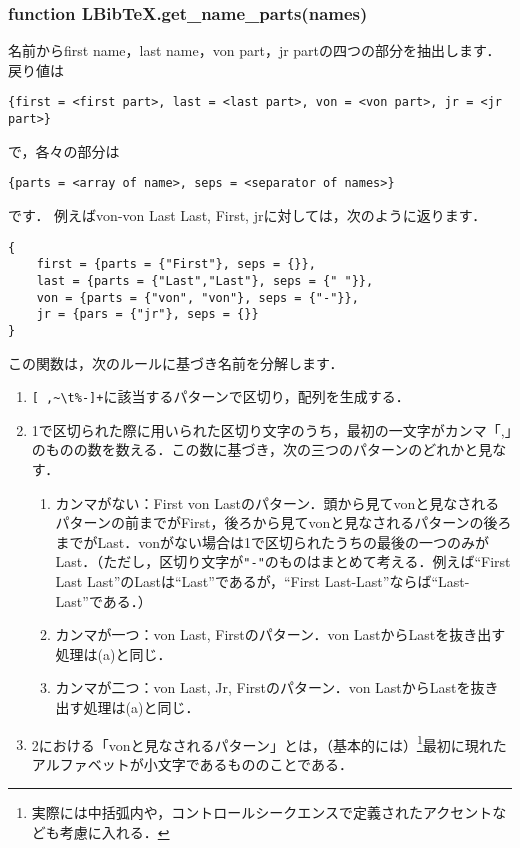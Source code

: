 \documentclass[a4paper]{ltjsarticle}
\begin{document}
\subsubsection{function LBibTeX.get\_name\_parts(names)}
名前からfirst name，last name，von part，jr partの四つの部分を抽出します．
戻り値は
\begin{lstlisting}
{first = <first part>, last = <last part>, von = <von part>, jr = <jr part>}
\end{lstlisting}
で，各々の部分は
\begin{lstlisting}
{parts = <array of name>, seps = <separator of names>}
\end{lstlisting}
です．%
例えばvon-von Last Last, First, jrに対しては，次のように返ります．
\begin{lstlisting}
{
	first = {parts = {"First"}, seps = {}},
	last = {parts = {"Last","Last"}, seps = {" "}},
	von = {parts = {"von", "von"}, seps = {"-"}},
	jr = {pars = {"jr"}, seps = {}}
}
\end{lstlisting}

この関数は，次のルールに基づき名前を分解します．
\begin{enumerate}
\item \verb|[ ,~\t%-]+|に該当するパターンで区切り，配列を生成する．
\item 1で区切られた際に用いられた区切り文字のうち，最初の一文字がカンマ「,」のものの数を数える．この数に基づき，次の三つのパターンのどれかと見なす．
\begin{enumerate}
\item カンマがない：First von Lastのパターン．頭から見てvonと見なされるパターンの前までがFirst，後ろから見てvonと見なされるパターンの後ろまでがLast．vonがない場合は1で区切られたうちの最後の一つのみがLast．（ただし，区切り文字が\verb|"-"|のものはまとめて考える．例えば``First Last Last''のLastは``Last''であるが，``First Last-Last''ならば``Last-Last''である．）
\item カンマが一つ：von Last, Firstのパターン．von LastからLastを抜き出す処理は(a)と同じ．
\item カンマが二つ：von Last, Jr, Firstのパターン．von LastからLastを抜き出す処理は(a)と同じ．
\end{enumerate}
\item 2における「vonと見なされるパターン」とは，（基本的には）\footnote{実際には中括弧内や，コントロールシークエンスで定義されたアクセントなども考慮に入れる．}最初に現れたアルファベットが小文字であるもののことである．
\end{enumerate}
\end{document}
